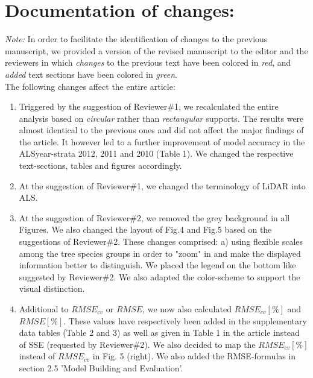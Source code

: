\documentclass{article}
\begin{document}
\section*{Documentation of changes:}

\textit{Note:} 
In order to facilitate the identification of changes to the previous manuscript, we provided a version of the revised manuscript to the editor and the reviewers in which \textit{changes} to the previous text have been colored in \textit{red}, and \textit{added} text sections have been colored in \textit{green}.\\

The following changes affect the entire article:

\begin{enumerate}
	
	\item Triggered by the suggestion of Reviewer\#1, we recalculated the entire analysis based on \textit{circular} rather than \textit{rectangular} supports. The results were almost identical to the previous ones and did not affect the major findings of the article. It however led to a further improvement of model accuracy in the ALSyear-strata 2012, 2011 and 2010 (Table 1). We changed the respective text-sections, tables and figures accordingly.
	
    \item At the suggestion of Reviewer\#1, we changed the terminology of LiDAR into ALS.
    
    \item At the suggestion of Reviewer\#2, we removed the grey background in all Figures. We also changed the layout of Fig.4 and Fig.5 based on the suggestions of Reviewer\#2. These changes comprised: a) using flexible scales among the tree species groups in order to "zoom" in and make the displayed information better to distinguish. We placed the legend on the bottom like suggested by Reviewer\#2. We also adapted the color-scheme to support the visual distinction.
    
    \item Additional to $RMSE_{cv}$ or $RMSE$, we now also calculated $RMSE_{cv}[\%]$ and $RMSE[\%]$. These values have respectively been added in the supplementary data tables (Table 2 and 3) as well as given in Table 1 in the article instead of SSE (requested by Reviewer\#2). We also decided to map the $RMSE_{cv}[\%]$ instead of $RMSE_{cv}$ in Fig. 5 (right). We also added the RMSE-formulas in section 2.5 'Model Building and Evaluation'.

\end{enumerate}
\end{document}
